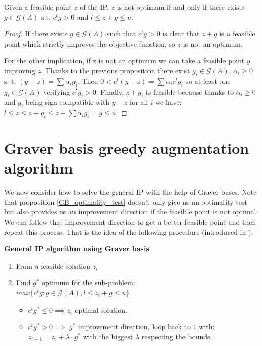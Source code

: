 \begin{proposition}\label{GB_optimality_test}
Given a feasible point $z$ of the IP, $z$ is not optimum if and only if there exists $g \in \mathcal{G}(A)$ s.t. $c^tg > 0$ and $l \leq z + g \leq u$.
\end{proposition}
\vspace{-20pt}
\begin{proof}
If there exists $g \in \mathcal{G}(A)$ such that $c^tg > 0$ is clear that $z + g$ is a feasible point which strictly improves the objective function, so $z$ is not an optimum. 

For the other implication, if z is not an optimum we can take a feasible point $y$ improving $z$. Thanks to the previous proposition there exist $g_i \in \mathcal{G}(A)$, $\alpha_i \geq 0$ s. t. $(y - z) = \sum \alpha_i g_i$. Then $0 < c^t(y - z) = \sum \alpha_i c^t g_i$ so at least one $g_i \in \mathcal{G}(A)$ verifying $c^tg_i > 0$. Finally, $z + g_i$ is feasible because thanks to $\alpha_i \geq 0$ and $g_i$ being sign compatible with $y - z$ for all $i$ we have: $l \leq z \leq z + g_i \leq z + \sum \alpha_i g_i = y \leq u$.
\end{proof}

\section{Graver basis greedy augmentation algorithm}

We now consider how to solve the general IP with the help of Graver bases. Note that proposition \ref{GB_optimality_test} doesn't only give us an optimality test but also provides us an improvement direction if the feasible point is not optimal. We can follow that improvement direction to get a better feasible point and then repeat this process. That is the idea of the following procedure (introduced in \cite{GRAVER:1975}):

\label{GB_greedy_algorithm}
\textbf{General IP algorithm using Graver basis}
\vspace{-8pt}
\begin{enumerate}
    \item From a feasible solution $z_i$
    \item Find $g^*$ optimum for the sub-problem: \vspace{4pt}\\
          $max\{c^tg : g \in \mathcal{G}(A), l \leq z_i + g \leq u \}$ \vspace{4pt}
    \begin{itemize}
        \item $c^tg^* \leq 0 \implies z_i$ optimal solution.
        \item $c^tg^* > 0 \implies$ $g^*$ improvement direction, loop back to 1 with:\\ $z_{i+1} = z_i + \lambda \cdot g^*$ with the biggest $\lambda$ respecting the bounds.
    \end{itemize}
\end{enumerate}

